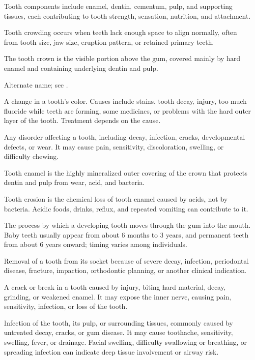  Tooth components include enamel, dentin, cementum, pulp, and supporting tissues, each contributing to tooth strength, sensation, nutrition, and attachment.

 Tooth crowding occurs when teeth lack enough space to align normally, often from tooth size, jaw size, eruption pattern, or retained primary teeth.

 The tooth crown is the visible portion above the gum, covered mainly by hard enamel and containing underlying dentin and pulp.

 Alternate name; see .

 A change in a tooth’s color. Causes include stains, tooth decay, injury, too much fluoride while teeth are forming, some medicines, or problems with the hard outer layer of the tooth. Treatment depends on the cause.

 Any disorder affecting a tooth, including decay, infection, cracks, developmental defects, or wear. It may cause pain, sensitivity, discoloration, swelling, or difficulty chewing.

 Tooth enamel is the highly mineralized outer covering of the crown that protects dentin and pulp from wear, acid, and bacteria.

 Tooth erosion is the chemical loss of tooth enamel caused by acids, not by bacteria. Acidic foods, drinks, reflux, and repeated vomiting can contribute to it.

 The process by which a developing tooth moves through the gum into the mouth. Baby teeth usually appear from about 6 months to 3 years, and permanent teeth from about 6 years onward; timing varies among individuals.

 Removal of a tooth from its socket because of severe decay, infection, periodontal disease, fracture, impaction, orthodontic planning, or another clinical indication.

 A crack or break in a tooth caused by injury, biting hard material, decay, grinding, or weakened enamel. It may expose the inner nerve, causing pain, sensitivity, infection, or loss of the tooth.


 Infection of the tooth, its pulp, or surrounding tissues, commonly caused by untreated decay, cracks, or gum disease.
It may cause toothache, sensitivity, swelling, fever, or drainage. Facial swelling, difficulty swallowing or
breathing, or spreading infection can indicate deep tissue involvement or airway risk.

